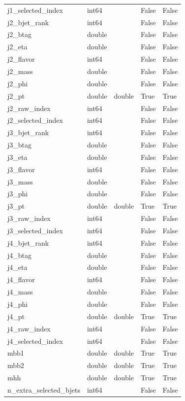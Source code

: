 \begin{tabular}{lllll}
j1\_selected\_index & int64 &  & False & False \\
j2\_bjet\_rank & int64 &  & False & False \\
j2\_btag & double &  & False & False \\
j2\_eta & double &  & False & False \\
j2\_flavor & int64 &  & False & False \\
j2\_mass & double &  & False & False \\
j2\_phi & double &  & False & False \\
j2\_pt & double & double & True & True \\
j2\_raw\_index & int64 &  & False & False \\
j2\_selected\_index & int64 &  & False & False \\
j3\_bjet\_rank & int64 &  & False & False \\
j3\_btag & double &  & False & False \\
j3\_eta & double &  & False & False \\
j3\_flavor & int64 &  & False & False \\
j3\_mass & double &  & False & False \\
j3\_phi & double &  & False & False \\
j3\_pt & double & double & True & True \\
j3\_raw\_index & int64 &  & False & False \\
j3\_selected\_index & int64 &  & False & False \\
j4\_bjet\_rank & int64 &  & False & False \\
j4\_btag & double &  & False & False \\
j4\_eta & double &  & False & False \\
j4\_flavor & int64 &  & False & False \\
j4\_mass & double &  & False & False \\
j4\_phi & double &  & False & False \\
j4\_pt & double & double & True & True \\
j4\_raw\_index & int64 &  & False & False \\
j4\_selected\_index & int64 &  & False & False \\
mbb1 & double & double & True & True \\
mbb2 & double & double & True & True \\
mhh & double & double & True & True \\
n\_extra\_selected\_bjets & int64 &  & False & False \\

\end{tabular}

